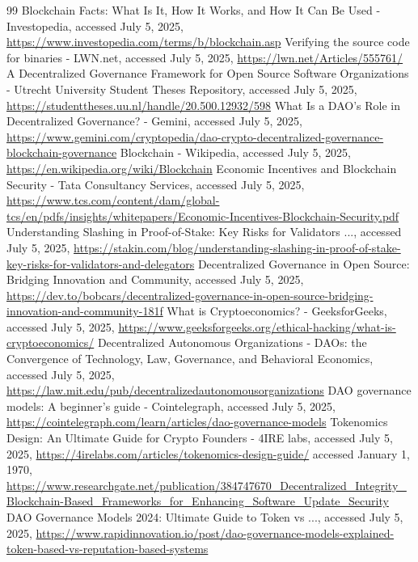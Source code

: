 \documentclass{article}
\begin{document}
\begin{thebibliography}{99}
Blockchain Facts: What Is It, How It Works, and How It Can Be Used - Investopedia, accessed July 5, 2025, \url{https://www.investopedia.com/terms/b/blockchain.asp}
Verifying the source code for binaries - LWN.net, accessed July 5, 2025, \url{https://lwn.net/Articles/555761/}
A Decentralized Governance Framework for Open Source Software Organizations - Utrecht University Student Theses Repository, accessed July 5, 2025, \url{https://studenttheses.uu.nl/handle/20.500.12932/598}
What Is a DAO's Role in Decentralized Governance? - Gemini, accessed July 5, 2025, \url{https://www.gemini.com/cryptopedia/dao-crypto-decentralized-governance-blockchain-governance}
Blockchain - Wikipedia, accessed July 5, 2025, \url{https://en.wikipedia.org/wiki/Blockchain}
Economic Incentives and Blockchain Security - Tata Consultancy Services, accessed July 5, 2025, \url{https://www.tcs.com/content/dam/global-tcs/en/pdfs/insights/whitepapers/Economic-Incentives-Blockchain-Security.pdf}
Understanding Slashing in Proof-of-Stake: Key Risks for Validators ..., accessed July 5, 2025, \url{https://stakin.com/blog/understanding-slashing-in-proof-of-stake-key-risks-for-validators-and-delegators}
Decentralized Governance in Open Source: Bridging Innovation and Community, accessed July 5, 2025, \url{https://dev.to/bobcars/decentralized-governance-in-open-source-bridging-innovation-and-community-181f}
What is Cryptoeconomics? - GeeksforGeeks, accessed July 5, 2025, \url{https://www.geeksforgeeks.org/ethical-hacking/what-is-cryptoeconomics/}
Decentralized Autonomous Organizations - DAOs: the Convergence of Technology, Law, Governance, and Behavioral Economics, accessed July 5, 2025, \url{https://law.mit.edu/pub/decentralizedautonomousorganizations}
DAO governance models: A beginner's guide - Cointelegraph, accessed July 5, 2025, \url{https://cointelegraph.com/learn/articles/dao-governance-models}
Tokenomics Design: An Ultimate Guide for Crypto Founders - 4IRE labs, accessed July 5, 2025, \url{https://4irelabs.com/articles/tokenomics-design-guide/}
accessed January 1, 1970, \url{https://www.researchgate.net/publication/384747670\_Decentralized\_Integrity\_Blockchain-Based\_Frameworks\_for\_Enhancing\_Software\_Update\_Security}
DAO Governance Models 2024: Ultimate Guide to Token vs ..., accessed July 5, 2025, \url{https://www.rapidinnovation.io/post/dao-governance-models-explained-token-based-vs-reputation-based-systems}

\end{thebibliography}
\end{document}
